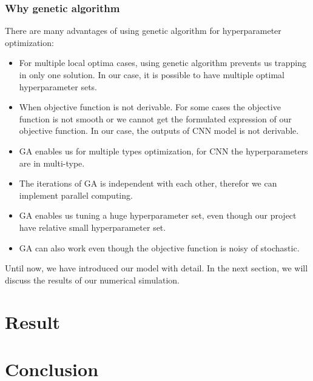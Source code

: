 \documentclass[12pt]{article}
\begin{document}
\subsubsection{Why genetic algorithm}
There are many advantages of using genetic algorithm for hyperparameter optimization:
\begin{itemize}
\item For multiple local optima cases, using genetic algorithm prevents us trapping in only one solution. In our case, it is possible to have multiple optimal hyperparameter sets.
\item When objective function is not derivable. For some cases the objective function is not smooth or we cannot get the formulated expression of our objective function. In our case, the outputs of CNN model is not derivable.
\item GA enables us for multiple types optimization, for CNN the hyperparameters are in multi-type.
\item The iterations of GA is independent with each other, therefor we can implement parallel computing.
\item GA enables us tuning a huge hyperparameter set, even though our project have relative small hyperparameter set.
\item GA can also work even though the objective function is noisy of stochastic.
\end{itemize}
Until now, we have introduced our model with detail. In the next section, we will discuss the results of our numerical simulation.
\section{Result}

\section{Conclusion}
\end{document}
